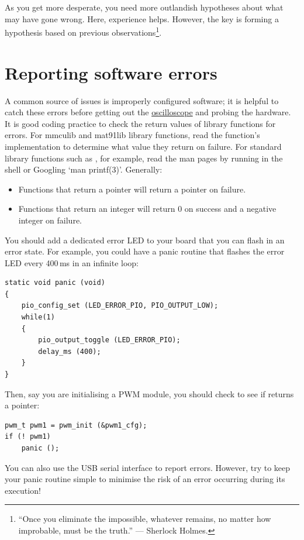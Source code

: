 As you get more desperate, you need more outlandish hypotheses about
what may have gone wrong.  Here, experience helps.  However, the key
is forming a hypothesis based on previous observations\footnote{``Once
  you eliminate the impossible, whatever remains, no matter how
  improbable, must be the truth.'' --- Sherlock Holmes.}.


\section{Reporting software errors}
\label{reporting-software-errors}

A common source of issues is improperly configured software; it is
helpful to catch these errors before getting out the
\hyperref[oscilloscope]{oscilloscope} and probing the hardware. It is
good coding practice to check the return values of library functions
for errors. For mmculib and mat91lib library functions, read the
function's implementation to determine what value they return on
failure. For standard library functions such as , for
example, read the man pages by running  in the
shell or Googling `man printf(3)'. Generally:
%
\begin{itemize}
\item Functions that return a pointer will return a 
  pointer on failure.

\item Functions that return an integer will return 0 on success and a
negative integer on failure.
\end{itemize}

You should add a dedicated error LED to your board that you can flash
in an error state. For example, you could have a panic routine that
flashes the error LED every 400\,ms in an infinite loop:
%
\begin{verbatim}
static void panic (void)
{
    pio_config_set (LED_ERROR_PIO, PIO_OUTPUT_LOW);
    while(1)
    {
        pio_output_toggle (LED_ERROR_PIO);
        delay_ms (400);
    }
}
\end{verbatim}
%
Then, say you are initialising a PWM module, you should check to see
if  returns a  pointer:
%
\begin{verbatim}
pwm_t pwm1 = pwm_init (&pwm1_cfg);
if (! pwm1)
    panic ();
\end{verbatim}
%
You can also use the USB serial interface to report errors. However,
try to keep your panic routine simple to minimise the risk of an error
occurring during its execution!

